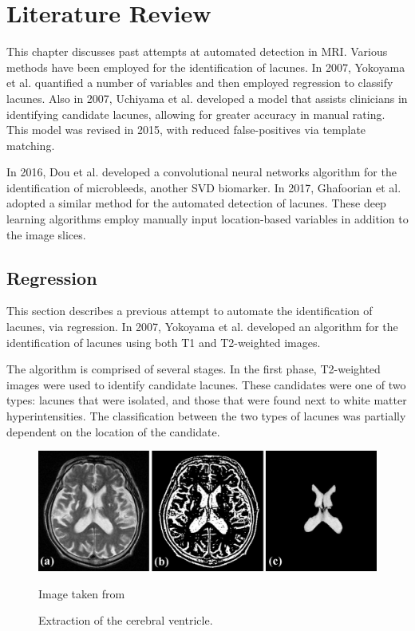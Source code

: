 


\chapter{Literature Review}\label{litrev-intro}

This chapter discusses past attempts at automated detection in MRI. Various methods have been employed for the identification of lacunes. In 2007, Yokoyama et al. \cite{Yokoyama2007} quantified a number of variables and then employed regression to classify lacunes. Also in 2007, Uchiyama et al. \cite{Uchiyama20071554} developed a model that assists clinicians in identifying candidate lacunes, allowing for greater accuracy in manual rating. This model was revised in 2015\cite{Uchiyama2015}, with reduced false-positives via template matching.

In 2016, Dou et al. \cite{DouQ.2016ADoC} developed a convolutional neural networks algorithm for the identification of microbleeds, another SVD biomarker. In 2017, Ghafoorian et al. \cite{GhafoorianM.2017Dml3} adopted a similar method for the automated detection of lacunes. These deep learning algorithms employ manually input location-based variables in addition to the image slices.


\section{Regression}\label{litrev-reg}

This section describes a previous attempt to automate the identification of lacunes, via regression. In 2007, Yokoyama et al. \cite{Yokoyama2007} developed an algorithm for the identification of lacunes using both T1 and T2-weighted images.


The algorithm is comprised of several stages. In the first phase, T2-weighted images were used to identify candidate lacunes. These candidates were one of two types: lacunes that were isolated, and those that were found next to white matter hyperintensities. The classification between the two types of lacunes was partially dependent on the location of the candidate.

\begin{figure}[ht]
	\centering
	\includegraphics[width=\textwidth]{Images/4_extract_ventricle.png}
	\caption{Extraction of the cerebral ventricle.}
	\small Image taken from \cite{Yokoyama2007}
\end{figure}


